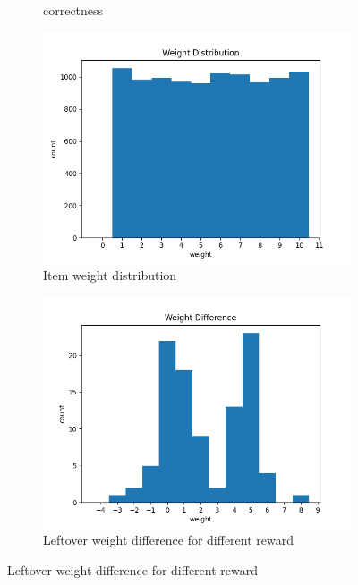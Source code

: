 \begin{figure}[htbp]
\begin{subfigure}[htbp]{0.25\textwidth}
        \caption{correctness}
        \label{fig:fig_2}
    \end{subfigure}
    \hfill
    \begin{subfigure}[htbp]{0.25\textwidth}
        \centering
        \includegraphics[width=\textwidth]{fig/asg1_weight_dist.png}
        \caption{Item weight distribution}
        \label{fig:weightdist}
    \end{subfigure}
    \hfill
    \begin{subfigure}[htbp]{0.25\textwidth}
        \centering
        \includegraphics[width=\textwidth]{fig/asg1_weight_diff.png}
        \caption{Leftover weight difference for different reward}
        \label{fig:weightdiff}
    \end{subfigure}
    \label{fig:gain}
\end{figure}
